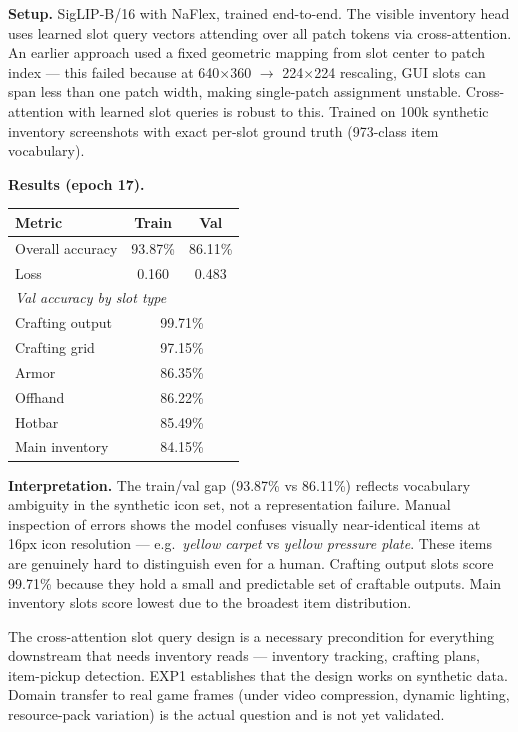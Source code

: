 \documentclass[11pt,a4paper]{article}
\begin{document}
\textbf{Setup.} SigLIP-B/16 with NaFlex, trained end-to-end. The visible inventory head uses learned slot query vectors attending over all patch tokens via cross-attention. An earlier approach used a fixed geometric mapping from slot center to patch index --- this failed because at 640$\times$360 $\to$ 224$\times$224 rescaling, GUI slots can span less than one patch width, making single-patch assignment unstable. Cross-attention with learned slot queries is robust to this. Trained on 100k synthetic inventory screenshots with exact per-slot ground truth (973-class item vocabulary).

\textbf{Results (epoch 17).}

\begin{center}
\begin{tabular}{lcc}
\toprule
Metric & Train & Val \\
\midrule
Overall accuracy & 93.87\% & 86.11\% \\
Loss & 0.160 & 0.483 \\
\midrule
\multicolumn{3}{l}{\textit{Val accuracy by slot type}} \\
Crafting output & \multicolumn{2}{c}{99.71\%} \\
Crafting grid & \multicolumn{2}{c}{97.15\%} \\
Armor & \multicolumn{2}{c}{86.35\%} \\
Offhand & \multicolumn{2}{c}{86.22\%} \\
Hotbar & \multicolumn{2}{c}{85.49\%} \\
Main inventory & \multicolumn{2}{c}{84.15\%} \\
\bottomrule
\end{tabular}
\end{center}

\textbf{Interpretation.} The train/val gap (93.87\% vs 86.11\%) reflects vocabulary ambiguity in the synthetic icon set, not a representation failure. Manual inspection of errors shows the model confuses visually near-identical items at 16px icon resolution --- e.g.\ \textit{yellow carpet} vs \textit{yellow pressure plate}. These items are genuinely hard to distinguish even for a human. Crafting output slots score 99.71\% because they hold a small and predictable set of craftable outputs. Main inventory slots score lowest due to the broadest item distribution.

\begin{designdecision}
The cross-attention slot query design is a necessary precondition for everything downstream that needs inventory reads --- inventory tracking, crafting plans, item-pickup detection. EXP1 establishes that the design works on synthetic data. Domain transfer to real game frames (under video compression, dynamic lighting, resource-pack variation) is the actual question and is not yet validated.
\end{designdecision}
\end{document}
